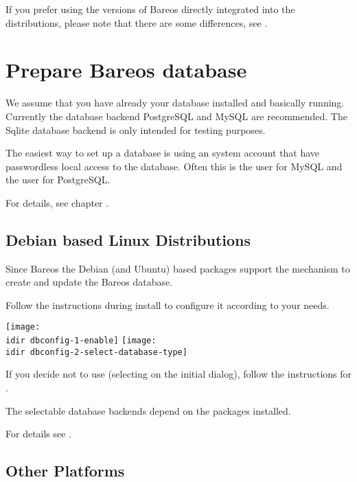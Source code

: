 If you prefer using the versions of Bareos directly integrated into the distributions, 
please note that there are some differences, see .

\section{Prepare Bareos database}
    \label{sec:CreateDatabase}

We assume that you have already your database installed and basically running.
Currently the database backend PostgreSQL and MySQL are recommended. The Sqlite database backend is only intended for testing purposes.

The easiest way to set up a database is using an system account that have passwordless local access to the database. 
Often this is the user  for MySQL and the user  for PostgreSQL.

For details, see chapter .

\subsection{Debian based Linux Distributions}

Since Bareos  the Debian (and Ubuntu) based packages support the  mechanism to create and update the Bareos database.

Follow the instructions during install to configure it according to your needs.

\begin{center}
\texttt{[image: \\idir dbconfig-1-enable]}
\texttt{[image: \\idir dbconfig-2-select-database-type]}
\end{center}

If you decide not to use  (selecting  on the initial dialog), 
follow the instructions for .

The selectable database backends depend on the  packages installed.

For details see .

\subsection{Other Platforms}
    \label{sec:CreateDatabaseOtherDistributions}

